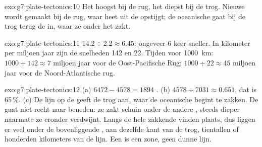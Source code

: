 \begin{solution}{exo:g7:plate-tectonics:10}
Het hoogst bij de rug, het diepst bij de trog. Nieuwe  wordt gemaakt
bij de rug, waar heet  uit de  opstijgt; de oceanische 
gaat bij de trog terug de  in, waar ze onder het  zakt.
\end{solution}

\begin{solution}{exo:g7:plate-tectonics:11}
$14.2 \div 2.2 \approx 6.45$: ongeveer 6 keer sneller. In
kilometer per miljoen jaar zijn de snelheden 142 en 22. Tijden voor
\qty{1000}{km}: $1000 \div 142 \approx 7$ miljoen jaar voor de
Oost-Pacifische Rug; $1000 \div 22 \approx 45$ miljoen jaar voor de
Noord-Atlantische rug.
\end{solution}

\begin{solution}{exo:g7:plate-tectonics:12}
(a) $6472 - 4578 = 1894$ . (b) $4578 \div 7031 \approx 0.651$,
dat is 65\,\%. (c) De lijn op de  geeft de trog aan, waar de
oceanische  begint te zakken. De  gaat niet recht naar beneden:
ze zakt schuin onder de andere , steeds dieper naarmate ze eronder
verdwijnt. Langs de hele zakkende  vinden  plaats, dus
liggen er veel onder de bovenliggende , aan dezelfde kant van de
trog, tientallen of honderden kilometers van de lijn. Een  is
een zone, geen dunne lijn.
\end{solution}

